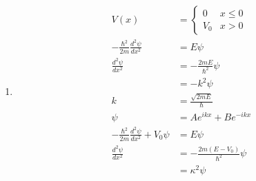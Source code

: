 \documentclass{article}
\begin{document}
\begin{enumerate}
  \item

        \begin{align*}
          V(x)                                                   & = \begin{cases}
                                                                       0   & x \le 0 \\
                                                                       V_0 & x > 0
                                                                     \end{cases}                                                                                                       \\
          -\frac{\hbar^2}{2 m} \frac{d^2 \psi}{d x^2}            & = E \psi                                                                                                              \\
          \frac{d^2 \psi}{d x^2}                                 & = -\frac{2 m E}{\hbar^2} \psi                                                                                         \\
                                                                 & = -k^2 \psi                                                                                                           \\
          k                                                      & = \frac{\sqrt{2 m E}}{\hbar}                                                                                          \\
          \psi                                                   & = A e^{i k x} + B e^{-i k x}                                                                                          \\
          -\frac{\hbar^2}{2 m} \frac{d^2 \psi}{d x^2} + V_0 \psi & = E \psi                                                                                                              \\
          \frac{d^2 \psi}{d x^2}                                 & = -\frac{2 m (E - V_0)}{\hbar^2} \psi                                                                                 \\
                                                                 & = \kappa^2 \psi                                                                                                       \\

\end{align*}
\end{enumerate}
\end{document}
